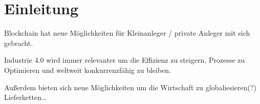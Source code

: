 \section{Einleitung}

Blockchain hat neue Möglichkeiten für Kleinanleger / private Anleger mit sich gebracht.

Industrie 4.0 wird immer relevanter um die Effizienz zu steigern, Prozesse zu Optimieren
und weltweit konkurrenzfähig zu bleiben.

Außerdem bieten sich neue Möglichkeiten um die Wirtschaft zu globaliesieren(?)
Lieferketten\dots 